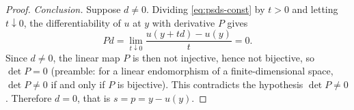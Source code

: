 \begin{proof}
\emph{Conclusion.}
Suppose $d\ne0$. Dividing \eqref{eq:psds-const} by $t>0$ and letting
$t\downarrow0$, the differentiability of $u$ at $y$ with derivative $P$ gives
\[
  Pd=\lim_{t\downarrow0}\frac{u(y+td)-u(y)}{t}=0 .
\]
Since $d\ne0$, the linear map $P$ is then not injective, hence not bijective, so
$\det P=0$ (preamble: for a linear endomorphism of a finite-dimensional space,
$\det P\ne0$ if and only if $P$ is bijective). This contradicts the hypothesis
$\det P\ne0$. Therefore $d=0$, that is $s=p=y-u(y)$.
\end{proof}
